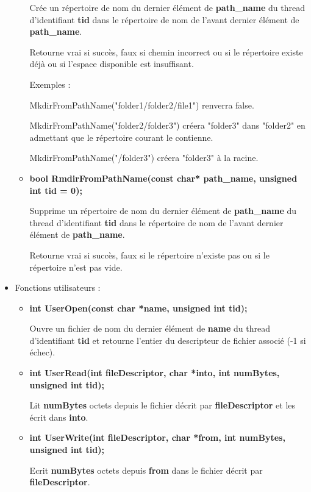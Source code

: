 \documentclass{article}
\begin{document}
\begin{itemize}
\begin{itemize}
  Crée un répertoire de nom du dernier élément de \textbf{path\_name} du thread d'identifiant \textbf{tid} dans le répertoire de nom de l'avant dernier élément de  \textbf{path\_name}.

  Retourne vrai si succès, faux si chemin incorrect ou si le répertoire existe déjà ou si l'espace disponible est insuffisant.

  Exemples :

  MkdirFromPathName("folder1/folder2/file1") renverra false.

  MkdirFromPathName("folder2/folder3") créera "folder3" dans "folder2" en admettant que le répertoire courant le contienne.

  MkdirFromPathName("/folder3") créera "folder3" à la racine.

 	\item
 	\textbf{bool RmdirFromPathName(const char* path\_name, unsigned int tid = 0);}

  Supprime un répertoire de nom du dernier élément de \textbf{path\_name} du thread d'identifiant \textbf{tid} dans le répertoire de nom de l'avant dernier élément de  \textbf{path\_name}.

  Retourne vrai si succès, faux si le répertoire n'existe pas ou si le répertoire n'est pas vide.


\end{itemize}

\item

Fonctions utilisateurs :

\begin{itemize}

	\item
    \textbf{int UserOpen(const char *name, unsigned int tid);}

	Ouvre un fichier de nom du dernier élément de \textbf{name} du thread d'identifiant \textbf{tid} et retourne l'entier du descripteur de fichier associé (-1 si échec).

	\item
    \textbf{int UserRead(int fileDescriptor, char *into, int numBytes, unsigned int tid);}

	Lit \textbf{numBytes} octets depuis le fichier décrit par \textbf{fileDescriptor} et les écrit dans \textbf{into}.

    \item
    \textbf{int UserWrite(int fileDescriptor, char *from, int numBytes, unsigned int tid);}

	Ecrit \textbf{numBytes} octets depuis \textbf{from} dans le fichier décrit par \textbf{fileDescriptor}.


\end{itemize}
\end{itemize}
\end{document}
